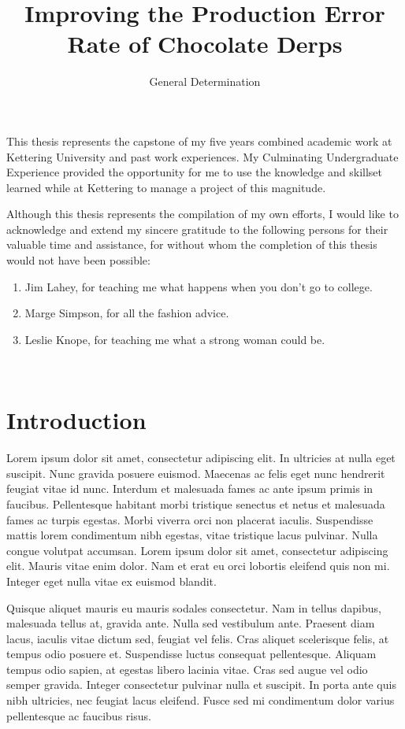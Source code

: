 \documentclass[letterpaper]{kuthesis}
\title{Improving the Production Error Rate of Chocolate Derps}
\author{General Determination}
\begin{document}
\maketitle[pp]

\begin{preface}
This thesis represents the capstone of my five years combined academic work 
at Kettering University and past work experiences.  My Culminating 
Undergraduate Experience provided the opportunity for me to use the 
knowledge and skillset learned while at Kettering to manage a project 
of this magnitude.

Although this thesis represents the compilation of my own efforts, I would 
like to acknowledge and extend my sincere gratitude to the following persons 
for their valuable time and assistance, for without whom the completion of 
this thesis would not have been possible:

\begin{enumerate}
  \item Jim Lahey, for teaching me what happens when you don't go to college.
  \item Marge Simpson, for all the fashion advice.
  \item Leslie Knope, for teaching me what a strong woman could be.
\end{enumerate}
\end{preface}

\singlespacing
\tableofcontents\
\listofillustrations

\begincontent

\chapter{Introduction}
Lorem ipsum dolor sit amet, consectetur adipiscing elit. In ultricies at nulla eget suscipit. Nunc gravida posuere euismod. Maecenas ac felis eget nunc hendrerit feugiat vitae id nunc. Interdum et malesuada fames ac ante ipsum primis in faucibus. Pellentesque habitant morbi tristique senectus et netus et malesuada fames ac turpis egestas. Morbi viverra orci non placerat iaculis. Suspendisse mattis lorem condimentum nibh egestas, vitae tristique lacus pulvinar. Nulla congue volutpat accumsan. Lorem ipsum dolor sit amet, consectetur adipiscing elit. Mauris vitae enim dolor. Nam et erat eu orci lobortis eleifend quis non mi. Integer eget nulla vitae ex euismod blandit.
\par Quisque aliquet mauris eu mauris sodales consectetur. Nam in tellus dapibus, malesuada tellus at, gravida ante. Nulla sed vestibulum ante. Praesent diam lacus, iaculis vitae dictum sed, feugiat vel felis. Cras aliquet scelerisque felis, at tempus odio posuere et. Suspendisse luctus consequat pellentesque. Aliquam tempus odio sapien, at egestas libero lacinia vitae. Cras sed augue vel odio semper gravida. Integer consectetur pulvinar nulla et suscipit. In porta ante quis nibh ultricies, nec feugiat lacus eleifend. Fusce sed mi condimentum dolor varius pellentesque ac faucibus risus.
\end{document}
